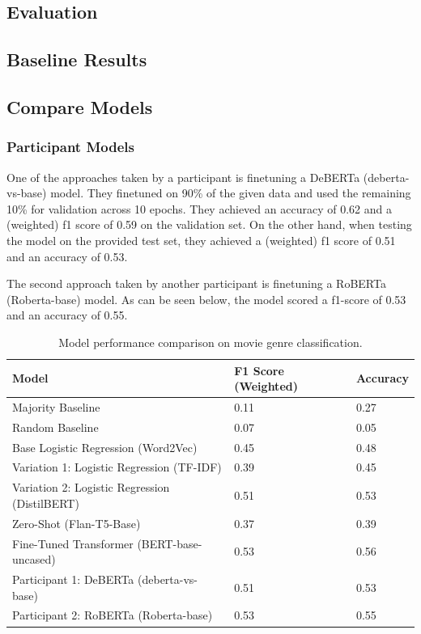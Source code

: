 \documentclass[11pt]{article}
\begin{document}
\subsection{Evaluation}


\subsection{Baseline Results}


\subsection{Compare Models}
\subsubsection{Participant Models}
One of the approaches taken by a participant is finetuning a DeBERTa (deberta-vs-base) model. 
They finetuned on 90\% of the given data and used the remaining 10\% for validation across 10 epochs. 
They achieved an accuracy of 0.62 and a (weighted) f1 score of 0.59 on the validation set. 
On the other hand, when testing the model on the provided test set, they achieved a (weighted) f1 score of 0.51 and an accuracy of 0.53. 

The second approach taken by another participant is finetuning a RoBERTa (Roberta-base) model. 
As can be seen below, the model scored a f1-score of 0.53 and an accuracy of 0.55. 







\begin{table}
  \centering
  \begin{tabular}{lll}
    \hline
    \textbf{Model} & \textbf{F1 Score (Weighted)} & \textbf{Accuracy} \\
    \hline
    Majority Baseline & 0.11 & 0.27 \\
    Random Baseline & 0.07 & 0.05 \\
    \hline
    Base Logistic Regression (Word2Vec) & 0.45 & 0.48 \\
    Variation 1: Logistic Regression (TF-IDF) & 0.39 & 0.45 \\
    Variation 2: Logistic Regression (DistilBERT) & 0.51 & 0.53 \\
    \hline
    Zero-Shot (Flan-T5-Base) & 0.37 & 0.39 \\
    \hline
    Fine-Tuned Transformer (BERT-base-uncased) & 0.53 & 0.56 \\
    \hline
    Participant 1: DeBERTa (deberta-vs-base) & 0.51 & 0.53 \\
    Participant 2: RoBERTa (Roberta-base) & 0.53 & 0.55 \\
    \hline
  \end{tabular}
  \caption{\label{model-results}
    Model performance comparison on movie genre classification.
  }
\end{table}
\end{document}
